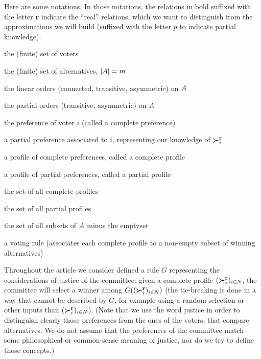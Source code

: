 \documentclass[version=last, pagesize, twoside=off, bibliography=totoc, DIV=calc, fontsize=14pt, a4paper, french, english]{scrartcl}
\begin{document}
Here are some notations. In those notations, the relations in bold suffixed with the letter \textbf{r} indicate the “real” relations, which we want to distinguish from the approximations we will build (suffixed with the letter $p$ to indicate partial knowledge).
\begin{description}[font=\normalfont, leftmargin=!, labelwidth=\widthof{$F: \allprofs \rightarrow \powersetz{\alts}$}]
	\item[$N$] the (finite) set of voters
	\item[$\alts$] the (finite) set of alternatives, $\lvert{A}\rvert = m$
	\item[$\linors \subseteq \powerset{\alts × \alts}$] the linear orders (connected, transitive, asymmetric) on $\alts$
	\item[$\pors \subseteq \powerset{\alts × \alts}$] the partial orders (transitive, asymmetric) on $\alts$
	\item[$\pref_i \in \linors$] the preference of voter $i$ (called a complete preference)
	\item[$\ppref_i \in \pors$] a partial preference associated to $i$, representing our knowledge of $\boldsymbol{\succ}^\textbf{r}_i$
	\item[$\prof = \profshort$] a profile of complete preferences, called a complete profile
	\item[$\pprof = \pprofshort$] a profile of partial preferences, called a partial profile
	\item[$\allprofs$] the set of all complete profiles
	\item[$\allpprofs$] the set of all partial profiles
	\item[$\powersetz{\alts}$] the set of all subsets of $\alts$ minus the emptyset
	\item[$F: \allprofs \rightarrow \powersetz{\alts}$] a voting rule (associates each complete profile to a non-empty subset of winning alternatives)
\end{description}

Throughout the article we consider defined a rule $G$ representing the considerations of justice of the committee: given a complete profile $(\boldsymbol{\succ}^\textbf{r}_i)_{i \in N}$, the committee will select a winner among $G((\boldsymbol{\succ}^\textbf{r}_i)_{i \in N})$ (the tie-breaking is done in a way that cannot be described by $G$, for example using a random selection or other inputs than $(\boldsymbol{\succ}^\textbf{r}_i)_{i \in N}$). 
(Note that we use the word justice in order to distinguish clearly those preferences from the ones of the voters, that compare alternatives. We do not assume that the preferences of the committee match some philosophical or common-sense meaning of justice, nor do we try to define those concepts.)
\end{document}
